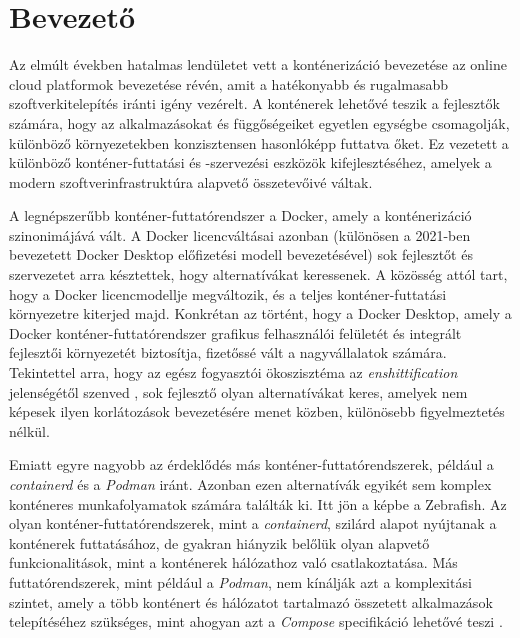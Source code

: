 \chapter{Bevezető}%

Az elmúlt években hatalmas lendületet vett a konténerizáció bevezetése az online cloud platformok bevezetése révén, amit a hatékonyabb és rugalmasabb szoftverkitelepítés iránti igény vezérelt. A konténerek lehetővé teszik a fejlesztők számára, hogy az alkalmazásokat és függőségeiket egyetlen egységbe csomagolják, különböző környezetekben konzisztensen hasonlóképp futtatva őket. Ez vezetett a különböző konténer-futtatási és -szervezési eszközök kifejlesztéséhez, amelyek a modern szoftverinfrastruktúra alapvető összetevőivé váltak.

A legnépszerűbb konténer-futtatórendszer a Docker, amely a konténerizáció szinonimájává vált. A Docker licencváltásai azonban (különösen a 2021-ben bevezetett Docker Desktop előfizetési modell bevezetésével) sok fejlesztőt és szervezetet arra késztettek, hogy alternatívákat keressenek. A közösség attól tart, hogy a Docker licencmodellje megváltozik, és a teljes konténer-futtatási környezetre kiterjed majd. Konkrétan az történt, hogy a Docker Desktop, amely a Docker konténer-futtatórendszer grafikus felhasználói felületét és integrált fejlesztői környezetét biztosítja, fizetőssé vált a nagyvállalatok számára. \cite{dockerdesktop2021} Tekintettel arra, hogy az egész fogyasztói ökoszisztéma az \textit{enshittification} jelenségétől szenved \cite{wright2024stakeholder}, sok fejlesztő olyan alternatívákat keres, amelyek nem képesek ilyen korlátozások bevezetésére menet közben, különösebb figyelmeztetés nélkül.

Emiatt egyre nagyobb az érdeklődés más konténer-futtatórendszerek, például a \textit{containerd} és a \textit{Podman} iránt. Azonban ezen alternatívák egyikét sem komplex konténeres munkafolyamatok számára találták ki. Itt jön a képbe a Zebrafish. Az olyan konténer-futtatórendszerek, mint a \textit{containerd}, szilárd alapot nyújtanak a konténerek futtatásához, de gyakran hiányzik belőlük olyan alapvető funkcionalitások, mint a konténerek hálózathoz való csatlakoztatása. \cite{containerdarchitecture} Más futtatórendszerek, mint például a \textit{Podman}, nem kínálják azt a komplexitási szintet, amely a több konténert és hálózatot tartalmazó összetett alkalmazások telepítéséhez szükséges, mint ahogyan azt a \textit{Compose} specifikáció lehetővé teszi \cite{ezeobi2024investigation}.

